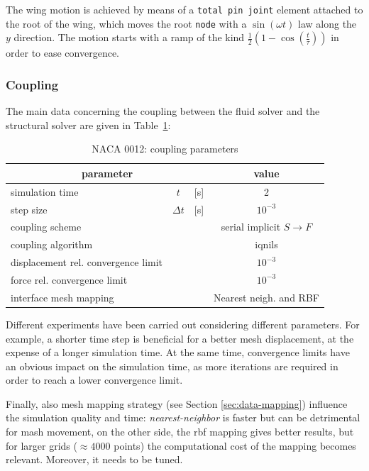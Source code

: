 The wing motion is achieved by means of a \texttt{total pin joint} element attached to the root of the wing, which moves the root \texttt{node} with a $\sin(\omega t)$ law along the $y$ direction. The motion starts with a ramp of the  kind $\frac{1}{2}\left(1-\cos\left(\frac{t}{\tau}\right)\right)$ in order to ease convergence.

\subsubsection{Coupling}

The main data concerning the coupling between the fluid solver and the structural solver  are given in Table~\ref{table:hc-coupling}:


\begin{table}[!htb]
	\begin{center}
		\begin{tabular}{ l c  l| c } 
			\multicolumn{3}{c|}{parameter} & value   \\ 
			\hline
			simulation time  & $t$& [\si{s}] & 2      \\
			step size & $\Delta t$ & [\si{s}] & $10^{-3}$   \\
			\hline
			coupling scheme & & & serial implicit  $S\rightarrow F$  \\
			coupling algorithm & & &  \acrshort{iqnils}  \\
			displacement rel. convergence limit & & & $10^{-3}$ \\
			force rel. convergence limit &&  & $10^{-3}$  \\
      		interface mesh mapping & & & Nearest neigh. and RBF  \\
			
		\end{tabular}
	\end{center}
	\caption{NACA 0012: coupling parameters}
	\label{table:hc-coupling}
\end{table}

Different experiments have been carried out considering different parameters. For example, a shorter time step is beneficial for a better mesh displacement, at the expense of a longer simulation time. At the same time, convergence limits have an obvious impact on the simulation time, as more iterations are required in order to reach a lower convergence limit.

Finally, also mesh mapping strategy (see Section \ref{sec:data-mapping}) influence the simulation quality and time: \textit{nearest-neighbor} is faster but can be detrimental for mash movement, on the other side, the \acrfull{rbf} mapping gives better results, but for larger grids ($\approx4000$ points) the computational cost of the mapping becomes relevant. Moreover, it needs to be tuned.

